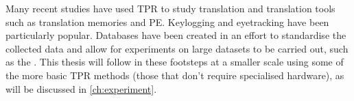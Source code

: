 Many recent studies have used \ac{TPR} to study translation and translation tools such as translation memories and \acl{PE}. Keylogging and eyetracking \parencite{obrien2009eyetracking} have been particularly popular. Databases have been created in an effort to standardise the collected data and allow for experiments on large datasets to be carried out, such as the  \parencite{carl2012critt}. This thesis will follow in these footsteps at a smaller scale using some of the more basic \ac{TPR} methods (those that don't require specialised hardware), as will be discussed in \autoref{ch:experiment}.
